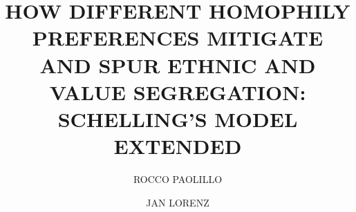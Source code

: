 \documentclass{ws-acs}
\begin{document}
\makeatletter
\def\@biblabel#1{[#1]}
\makeatother


%
\catchline{}{}{}{}{}
%

\title{HOW DIFFERENT HOMOPHILY PREFERENCES MITIGATE AND SPUR ETHNIC AND  VALUE  SEGREGATION: SCHELLING'S MODEL EXTENDED}

\author{ROCCO PAOLILLO}

\address{Bremen International Graduate School of Social Sciences, Jacobs University Bremen \& University of Bremen, \\
Campus Ring 1,
Bremen, 28759,
Germany\\
rpaolillo@bigsss-bremen.de}

\author{JAN LORENZ}

\address{Bremen International Graduate School of Social Sciences, Jacobs University Bremen \& GESIS Leibniz Institute for the Social Sciences,\\ Campus Ring 1
Köln, 50667,
Germany\\
j.lorenz@jacobs-university.de}

\maketitle

\begin{history}
\end{history}
\end{document}
